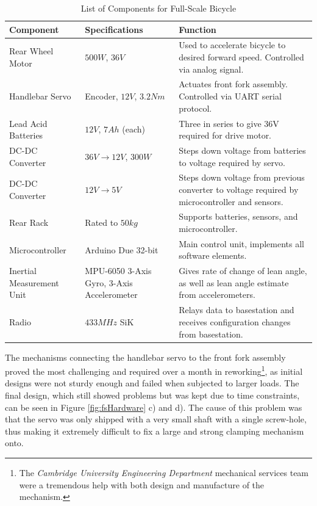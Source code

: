\begin{table}[H]
	\centering
 	\begin{tabular}[t]{p{4cm} p{4cm} p{7cm}} 
	\toprule
	Component & Specifications & Function \\
 	\midrule
 	Rear Wheel Motor & $\si{500W}$, $\si{36V}$ & Used to accelerate bicycle to desired forward speed. Controlled via analog signal. \\ 
 	Handlebar Servo & Encoder, $\si{12V}$, $3.2\si{Nm}$ & Actuates front fork assembly. Controlled via UART serial protocol. \\
 	Lead Acid Batteries & $\si{12V}$, $\si{7Ah}$ (each) & Three in series to give 36V required for drive motor. \\
 	DC-DC Converter & $\si{36V} \rightarrow \si{12V}$, $\si{300W}$ & Steps down voltage from batteries to voltage required by servo. \\
 	DC-DC Converter & $\si{12V} \rightarrow \si{5V}$ & Steps down voltage from previous converter to voltage required by microcontroller and sensors. \\
 	Rear Rack & Rated to $\si{50kg}$ & Supports batteries, sensors, and microcontroller. \\
 	Microcontroller & Arduino Due 32-bit & Main control unit, implements all software elements. \\
 	Inertial Measurement Unit & MPU-6050 3-Axis Gyro, 3-Axis Accelerometer & Gives rate of change of lean angle, as well as lean angle estimate from accelerometers. \\
 	Radio & $433\si{MHz}$ SiK & Relays data to basestation and receives configuration changes from basestation. \\
 	\bottomrule
	\end{tabular}
 	\caption{List of Components for Full-Scale Bicycle}
	\label{table:fscomponents}
\end{table}

The mechanisms connecting the handlebar servo to the front fork assembly proved the most challenging and required over a month in reworking\footnote{The \textit{Cambridge University Engineering Department} mechanical services team were a tremendous help with both design and manufacture of the mechanism.}, as initial designs were not sturdy enough and failed when subjected to larger loads. The final design, which still showed problems but was kept due to time constraints, can be seen in Figure \ref{fig:fsHardware} c) and d). The cause of this problem was that the servo was only shipped with a very small shaft with a single screw-hole, thus making it extremely difficult to fix a large and strong clamping mechanism onto. \\

